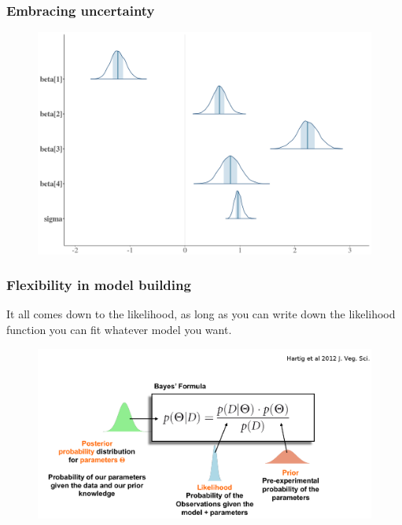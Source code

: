 \documentclass{beamer}
\begin{document}
 
  \begin{frame}
  \frametitle{\bf Embracing uncertainty}
  
  \begin{figure}
   \includegraphics[width=\textwidth,height=.7\textheight,keepaspectratio]{posterior-params.png}
  \end{figure}

  
  
 \end{frame}
 
  \begin{frame}
  \frametitle{\bf Flexibility in model building}
  
  It all comes down to the likelihood, as long as you can write down the likelihood function you can fit whatever model you want.
  
  \begin{figure}
   \includegraphics[width=.7\textwidth,height=.6\textheight,keepaspectratio]{summ.png}
  \end{figure}

  
 \end{frame}
 
\end{document}
